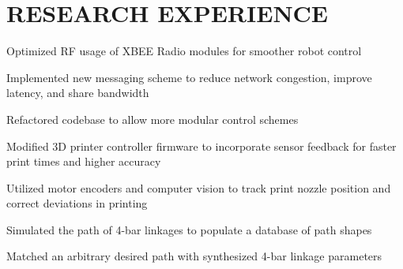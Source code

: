 \documentclass[]{resume}
\begin{document}
\begin{minipage}[t]{0.66\textwidth} 

\section{RESEARCH EXPERIENCE}

\hfill
\begin{tightemize}
\item Optimized RF usage of XBEE Radio modules for smoother robot control
\item Implemented new messaging scheme to reduce network congestion, improve latency, and share bandwidth
\item Refactored codebase to allow more modular control schemes
\end{tightemize}
\sectionsep

\begin{tightemize}
\item Modified 3D printer controller firmware to incorporate sensor feedback for faster print times and higher accuracy
\item Utilized motor encoders and computer vision to track print nozzle position and correct deviations in printing
\end{tightemize}
\sectionsep

\begin{tightemize}
\item Simulated the path of 4-bar linkages to populate a database of path shapes
\item Matched an arbitrary desired path with synthesized 4-bar linkage parameters
\end{tightemize}
\sectionsep


\end{minipage} 
\end{document}
